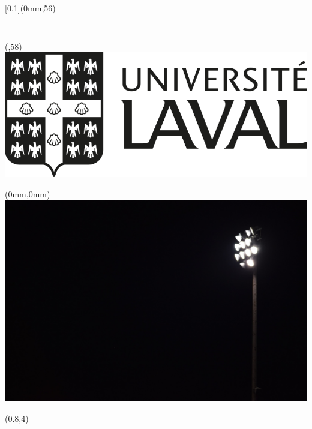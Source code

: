 \begin{frame}[plain]
  \begin{textblock*}{\paperwidth}[0,1](0mm,56\TPVertModule)
    \textcolor{ulgray_red}{\rule{\banderougewidth}{\banderougeheight}}%
    \textcolor{ulgray_gold}{\rule{\bandeorwidth}{\bandeorheight}}           %
  \end{textblock*}

  \begin{textblock*}{\bandeorwidth}(\banderougewidth,58\TPVertModule)
    \includegraphics[height=\logoheight,keepaspectratio=true]{img/ul_logo_mono.png}
  \end{textblock*}

  \begin{textblock*}{\paperwidth}(0mm,0mm)
    \includegraphics[height=\imageheight,width=\paperwidth]{img/fond_lumiere_stade.jpg}
  \end{textblock*}

  \begin{textblock*}{\banderougewidth}(0.8\TPHorizModule,4\TPVertModule)


\end{textblock*}
\end{frame}
